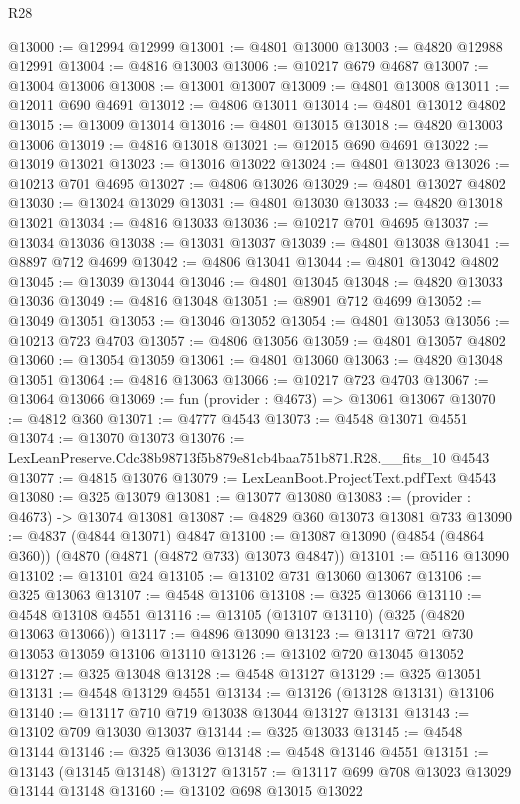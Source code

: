\begin{lexlean}{R28}
\begin{coremodule}
@13000 := @12994 @12999
@13001 := @4801 @13000
@13003 := @4820 @12988 @12991
@13004 := @4816 @13003
@13006 := @10217 @679 @4687
@13007 := @13004 @13006
@13008 := @13001 @13007
@13009 := @4801 @13008
@13011 := @12011 @690 @4691
@13012 := @4806 @13011
@13014 := @4801 @13012 @4802
@13015 := @13009 @13014
@13016 := @4801 @13015
@13018 := @4820 @13003 @13006
@13019 := @4816 @13018
@13021 := @12015 @690 @4691
@13022 := @13019 @13021
@13023 := @13016 @13022
@13024 := @4801 @13023
@13026 := @10213 @701 @4695
@13027 := @4806 @13026
@13029 := @4801 @13027 @4802
@13030 := @13024 @13029
@13031 := @4801 @13030
@13033 := @4820 @13018 @13021
@13034 := @4816 @13033
@13036 := @10217 @701 @4695
@13037 := @13034 @13036
@13038 := @13031 @13037
@13039 := @4801 @13038
@13041 := @8897 @712 @4699
@13042 := @4806 @13041
@13044 := @4801 @13042 @4802
@13045 := @13039 @13044
@13046 := @4801 @13045
@13048 := @4820 @13033 @13036
@13049 := @4816 @13048
@13051 := @8901 @712 @4699
@13052 := @13049 @13051
@13053 := @13046 @13052
@13054 := @4801 @13053
@13056 := @10213 @723 @4703
@13057 := @4806 @13056
@13059 := @4801 @13057 @4802
@13060 := @13054 @13059
@13061 := @4801 @13060
@13063 := @4820 @13048 @13051
@13064 := @4816 @13063
@13066 := @10217 @723 @4703
@13067 := @13064 @13066
@13069 := fun (provider : @4673) => @13061 @13067
@13070 := @4812 @360
@13071 := @4777 @4543
@13073 := @4548 @13071 @4551
@13074 := @13070 @13073
@13076 := LexLeanPreserve.Cdc38b98713f5b879e81cb4baa751b871.R28.__fits_10 @4543
@13077 := @4815 @13076
@13079 := LexLeanBoot.ProjectText.pdfText @4543
@13080 := @325 @13079
@13081 := @13077 @13080
@13083 := (provider : @4673) -> @13074 @13081
@13087 := @4829 @360 @13073 @13081 @733
@13090 := @4837 (@4844 @13071) @4847
@13100 := @13087 @13090 (@4854 (@4864 @360)) (@4870 (@4871 (@4872 @733) @13073 @4847))
@13101 := @5116 @13090
@13102 := @13101 @24
@13105 := @13102 @731 @13060 @13067
@13106 := @325 @13063
@13107 := @4548 @13106
@13108 := @325 @13066
@13110 := @4548 @13108 @4551
@13116 := @13105 (@13107 @13110) (@325 (@4820 @13063 @13066))
@13117 := @4896 @13090
@13123 := @13117 @721 @730 @13053 @13059 @13106 @13110
@13126 := @13102 @720 @13045 @13052
@13127 := @325 @13048
@13128 := @4548 @13127
@13129 := @325 @13051
@13131 := @4548 @13129 @4551
@13134 := @13126 (@13128 @13131) @13106
@13140 := @13117 @710 @719 @13038 @13044 @13127 @13131
@13143 := @13102 @709 @13030 @13037
@13144 := @325 @13033
@13145 := @4548 @13144
@13146 := @325 @13036
@13148 := @4548 @13146 @4551
@13151 := @13143 (@13145 @13148) @13127
@13157 := @13117 @699 @708 @13023 @13029 @13144 @13148
@13160 := @13102 @698 @13015 @13022

\end{coremodule}
\end{lexlean}
